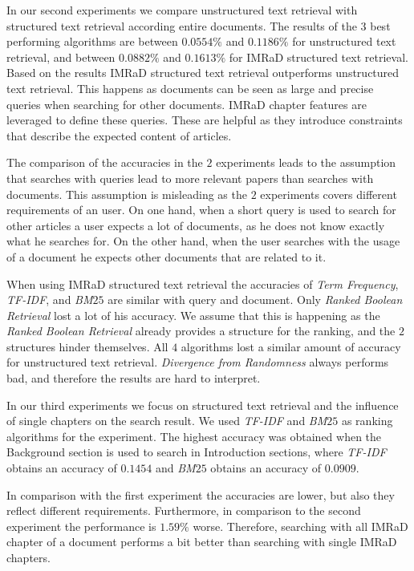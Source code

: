In our second experiments we compare unstructured text retrieval with structured text retrieval according entire documents. The results of the $3$ best performing algorithms are between $0.0554\%$ and $0.1186\%$ for unstructured text retrieval, and between $0.0882\%$ and $0.1613\%$ for IMRaD structured text retrieval. Based on the results IMRaD structured text retrieval outperforms unstructured text retrieval. This happens as documents can be seen as large and precise queries when searching for other documents. IMRaD chapter features are leveraged to define these queries. These are helpful as they introduce constraints that describe the expected content of articles.

The comparison of the accuracies in the $2$ experiments leads to the assumption that searches with queries lead to more relevant papers than searches with documents. This assumption is misleading as the $2$ experiments covers different requirements of an user. On one hand, when a short query is used to search for other articles a user expects a lot of documents, as he does not know exactly what he searches for. On the other hand, when the user searches with the usage of a document he expects other documents that are related to it.

When using IMRaD structured text retrieval the accuracies of \textit{Term Frequency}, \textit{TF-IDF}, and \textit{BM$25$} are similar with query and document. Only \textit{Ranked Boolean Retrieval} lost a lot of his accuracy. We assume that this is happening as the \textit{Ranked Boolean Retrieval} already provides a structure for the ranking, and the $2$ structures hinder themselves. All $4$ algorithms lost a similar amount of accuracy for unstructured text retrieval. \textit{Divergence from Randomness} always performs bad, and therefore the results are hard to interpret.

In our third experiments we focus on structured text retrieval and the influence of single chapters on the search result. We used \textit{TF-IDF} and \textit{BM$25$} as ranking algorithms for the experiment. The highest accuracy was obtained when the Background section is used to search in Introduction sections, where \textit{TF-IDF} obtains an accuracy of $0.1454$ and \textit{BM$25$} obtains an accuracy of $0.0909$. 

In comparison with the first experiment the accuracies are lower, but also they reflect different requirements. Furthermore, in comparison to the second experiment the performance is $1.59\%$ worse. Therefore, searching with all IMRaD chapter of a document performs a bit better than searching with single IMRaD chapters.

